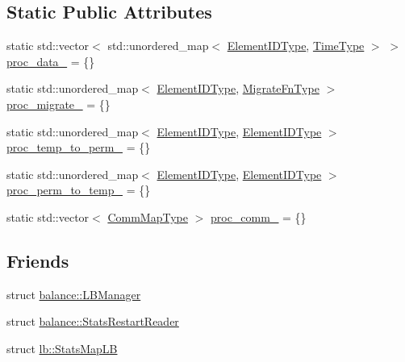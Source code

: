 \subsection*{Static Public Attributes}
\begin{DoxyCompactItemize}
\item 
static std\+::vector$<$ std\+::unordered\+\_\+map$<$ \hyperlink{namespacevt_1_1vrt_1_1collection_1_1balance_a14c8d2c972f2913aa3f1636e5be0a120}{Element\+I\+D\+Type}, \hyperlink{namespacevt_a876a9d0cd5a952859c72de8a46881442}{Time\+Type} $>$ $>$ \hyperlink{structvt_1_1vrt_1_1collection_1_1balance_1_1_proc_stats_a865fdc4288dbbde5fa76de192b877c16}{proc\+\_\+data\+\_\+} = \{\}
\item 
static std\+::unordered\+\_\+map$<$ \hyperlink{namespacevt_1_1vrt_1_1collection_1_1balance_a14c8d2c972f2913aa3f1636e5be0a120}{Element\+I\+D\+Type}, \hyperlink{structvt_1_1vrt_1_1collection_1_1balance_1_1_proc_stats_a7cb065ac4de218cb717bc2634782f0cb}{Migrate\+Fn\+Type} $>$ \hyperlink{structvt_1_1vrt_1_1collection_1_1balance_1_1_proc_stats_a086a4958899fed23d9408ab3e79c2f96}{proc\+\_\+migrate\+\_\+} = \{\}
\item 
static std\+::unordered\+\_\+map$<$ \hyperlink{namespacevt_1_1vrt_1_1collection_1_1balance_a14c8d2c972f2913aa3f1636e5be0a120}{Element\+I\+D\+Type}, \hyperlink{namespacevt_1_1vrt_1_1collection_1_1balance_a14c8d2c972f2913aa3f1636e5be0a120}{Element\+I\+D\+Type} $>$ \hyperlink{structvt_1_1vrt_1_1collection_1_1balance_1_1_proc_stats_a9bf0a8d34c3062ba54309ea916eca8c5}{proc\+\_\+temp\+\_\+to\+\_\+perm\+\_\+} = \{\}
\item 
static std\+::unordered\+\_\+map$<$ \hyperlink{namespacevt_1_1vrt_1_1collection_1_1balance_a14c8d2c972f2913aa3f1636e5be0a120}{Element\+I\+D\+Type}, \hyperlink{namespacevt_1_1vrt_1_1collection_1_1balance_a14c8d2c972f2913aa3f1636e5be0a120}{Element\+I\+D\+Type} $>$ \hyperlink{structvt_1_1vrt_1_1collection_1_1balance_1_1_proc_stats_a65b3b05a4a902dbf8d9bcb6226ea8ac3}{proc\+\_\+perm\+\_\+to\+\_\+temp\+\_\+} = \{\}
\item 
static std\+::vector$<$ \hyperlink{namespacevt_1_1vrt_1_1collection_1_1balance_aa50d4cbbfa3c643e7303fc6e08f411fb}{Comm\+Map\+Type} $>$ \hyperlink{structvt_1_1vrt_1_1collection_1_1balance_1_1_proc_stats_ac454c4af13542a9f9f3aad02f2c69ab8}{proc\+\_\+comm\+\_\+} = \{\}
\end{DoxyCompactItemize}
\subsection*{Friends}
\begin{DoxyCompactItemize}
\item 
struct \hyperlink{structvt_1_1vrt_1_1collection_1_1balance_1_1_proc_stats_a056386ff2e334ebef478bf4e1a4224c7}{balance\+::\+L\+B\+Manager}
\item 
struct \hyperlink{structvt_1_1vrt_1_1collection_1_1balance_1_1_proc_stats_a3162de432c02588c40ca2a7dcb51e769}{balance\+::\+Stats\+Restart\+Reader}
\item 
struct \hyperlink{structvt_1_1vrt_1_1collection_1_1balance_1_1_proc_stats_aa707ee9cd218bee0d66e58418a06f7f5}{lb\+::\+Stats\+Map\+LB}
\end{DoxyCompactItemize}


